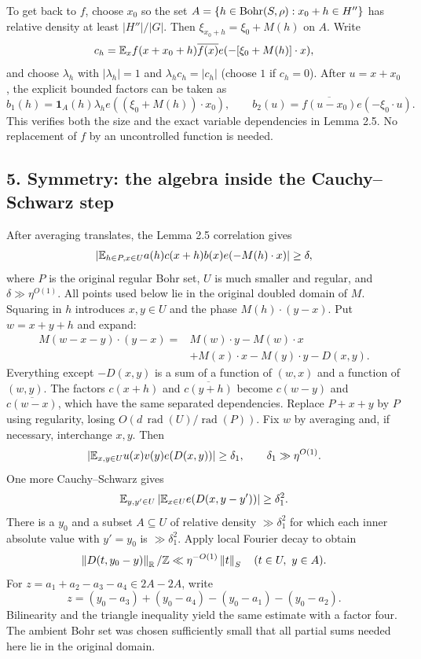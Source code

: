 To get back to $f$, choose $x_0$ so the set
$A=\{h\in\operatorname{Bohr}(S,\rho):x_0+h\in H''\}$ has relative density
at least $|H''|/|G|$. Then $\xi_{x_0+h}=\xi_0+M(h)$ on $A$.
Write
\[c_h=\mathbb E_xf(x+x_0+h)\overline{f(x)}e(-[\xi_0+M(h)]\cdot x),\]
and choose $\lambda_h$ with $|\lambda_h|=1$ and
$\lambda_hc_h=|c_h|$ (choose $1$ if $c_h=0$). After $u=x+x_0$,
the explicit bounded factors can be taken as
\[
b_1(h)=\mathbf1_A(h)\lambda_h e((\xi_0+M(h))\cdot x_0),
\qquad b_2(u)=\overline{f(u-x_0)}e(-\xi_0\cdot u).
\]
This verifies both the size and the exact variable dependencies in
Lemma 2.5. No replacement of $f$ by an uncontrolled function is needed.

\subsection*{5. Symmetry: the algebra inside the Cauchy--Schwarz step}
After averaging translates, the Lemma 2.5 correlation gives
\[
\left|\mathbb E_{h\in P,x\in U}a(h)c(x+h)b(x)e(-M(h)\cdot x)\right|\geq\delta,
\]
where $P$ is the original regular Bohr set, $U$ is much smaller and
regular, and $\delta\gg\eta^{O(1)}$. All points used below lie in the
original doubled domain of $M$. Squaring in $h$ introduces $x,y\in U$
and the phase $M(h)\cdot(y-x)$. Put $w=x+y+h$ and expand:
\[
\begin{aligned}
M(w-x-y)\cdot(y-x)
={}&M(w)\cdot y-M(w)\cdot x\\
&+M(x)\cdot x-M(y)\cdot y-D(x,y).
\end{aligned}
\]
Everything except $-D(x,y)$ is a sum of a function of $(w,x)$ and
a function of $(w,y)$. The factors $c(x+h)$ and
$\overline{c(y+h)}$ become $c(w-y)$ and $\overline{c(w-x)}$,
which have the same separated dependencies. Replace $P+x+y$ by $P$
using regularity, losing $O(d\,\operatorname{rad}(U)/\operatorname{rad}(P))$.
Fix $w$ by averaging and, if necessary, interchange $x,y$. Then
\[\left|\mathbb E_{x,y\in U}u(x)v(y)e(D(x,y))\right|\geq\delta_1,
\qquad\delta_1\gg\eta^{O(1)}.\]
One more Cauchy--Schwarz gives
\[\mathbb E_{y,y'\in U}\left|\mathbb E_{x\in U}e(D(x,y-y'))\right|\geq\delta_1^2.\]
There is a $y_0$ and a subset $A\subseteq U$ of relative density
$\gg\delta_1^2$ for which each inner absolute value with $y'=y_0$
is $\gg\delta_1^2$. Apply local Fourier decay to obtain
\[\left\|D(t,y_0-y)\right\|_\mathbb R/\mathbb Z\ll\eta^{-O(1)}\left\|t\right\|_S
\quad(t\in U,\ y\in A).\]
For $z=a_1+a_2-a_3-a_4\in2A-2A$, write
\[z=(y_0-a_3)+(y_0-a_4)-(y_0-a_1)-(y_0-a_2).\]
Bilinearity and the triangle inequality yield the same estimate with a
factor four. The ambient Bohr set was chosen sufficiently small that all
partial sums needed here lie in the original domain.

